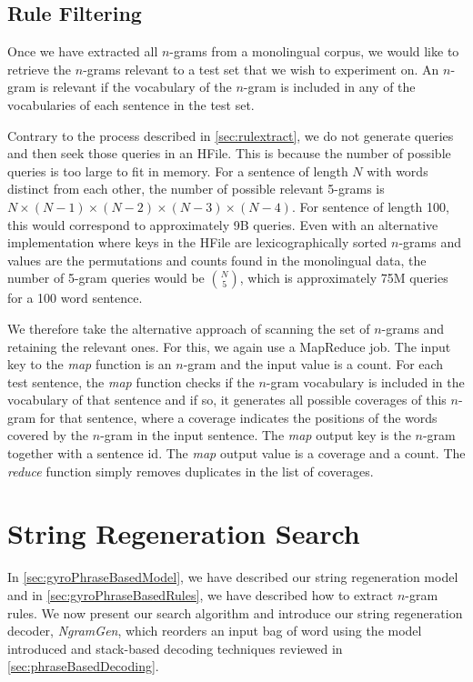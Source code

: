 \subsection{Rule Filtering}
\label{sec:ngramRuleFiltering}

Once we have extracted all $n$-grams from a monolingual corpus, we
would like to retrieve the $n$-grams relevant to a test set
that we wish to experiment on. An $n$-gram is relevant if the vocabulary
of the $n$-gram is included in any of the vocabularies of each
sentence in the test set.

Contrary to the process described in \autoref{sec:rulextract}, we
do not generate queries and then seek those queries in an HFile.
This is because the number of possible queries is too large
to fit in memory. For a sentence of length $N$ with words distinct
from each other, the number of possible relevant 5-grams is
$N \times (N - 1) \times (N - 2) \times (N - 3) \times (N - 4)$.
For sentence of length 100, this would correspond to approximately
9B queries. Even with an alternative implementation where keys in the
HFile are lexicographically sorted $n$-grams and values are the
permutations and counts found in
the monolingual data, the number of 5-gram queries would be $N \choose 5$, which
is approximately 75M queries for a 100 word sentence.

We therefore take the alternative approach of scanning the set of $n$-grams
and retaining the relevant ones. For this, we again use a MapReduce
job. The input key to the \emph{map} function is an $n$-gram and
the input value is a count. For each test sentence, the \emph{map}
function checks if the $n$-gram vocabulary is included in the
vocabulary of that sentence and if so, it generates all possible
coverages of this $n$-gram for that sentence, where a coverage
indicates the positions of the words covered by the $n$-gram
in the input sentence. The \emph{map}
output key is the $n$-gram together with a sentence id. The \emph{map}
output value is a coverage and a count. The \emph{reduce} function
simply removes duplicates in the list of coverages. %

\section{String Regeneration Search}
\label{sec:gyroDecoderAlgorithm}

In \autoref{sec:gyroPhraseBasedModel}, we have described our
string regeneration model and in \autoref{sec:gyroPhraseBasedRules},
we have described how to extract $n$-gram rules. We now
present our search algorithm and introduce our
string regeneration decoder, \emph{NgramGen}, which
reorders an input bag of word using the model introduced and
stack-based decoding techniques reviewed in \autoref{sec:phraseBasedDecoding}.

